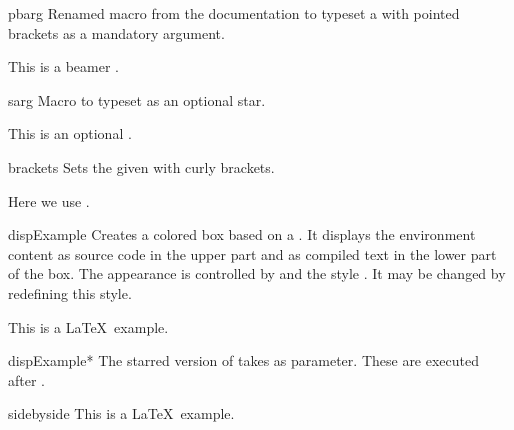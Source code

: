 \clearpage

\begin{docCommand}[doc new={2025-05-28}]{pbarg}{}
  Renamed macro from the \cite{tantau:beamer} documentation to typeset a  with
  pointed brackets as a mandatory argument.
\begin{dispExample}
This is a beamer .
\end{dispExample}
\end{docCommand}


\begin{docCommand}[doc new=2023-02-16]{sarg}{}
  Macro to typeset \sarg{} as an optional star.
\begin{dispExample}
This is an optional \sarg.
\end{dispExample}
\end{docCommand}


\begin{docCommand}{brackets}{}
  Sets the given  with curly brackets.
\begin{dispExample}
  Here we use .
\end{dispExample}
\end{docCommand}


{\let\xdispExample\dispExample
  \let\endxdispExample\enddispExample
\begin{docEnvironment}[doc updated=2014-10-10]{dispExample}{}
  Creates a colored box based on a .
  It displays the environment content as source code in the upper part
  and as compiled text in the lower part of the box.
  The appearance is controlled by 
  and the style . It may be
  changed by redefining this style.
{
\begin{xdispExample}
\begin{dispExample}
This is a \LaTeX\ example.
\end{dispExample}
\end{xdispExample}
}
\end{docEnvironment}}


{\let\xdispExample\dispExample
  \let\endxdispExample\enddispExample
\begin{docEnvironment}[doc updated=2014-10-10]{dispExample*}{}
  The starred version of  takes  
  as parameter. These  are executed after .
\begin{xdispExample}
\begin{dispExample*}{sidebyside}
This is a \LaTeX\ example.
\end{dispExample*}
\end{xdispExample}
\end{docEnvironment}}


